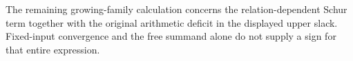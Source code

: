 The remaining growing-family calculation concerns the relation-dependent
Schur term together with the original arithmetic deficit in the displayed
upper slack. Fixed-input convergence and the free summand alone do not
supply a sign for that entire expression.